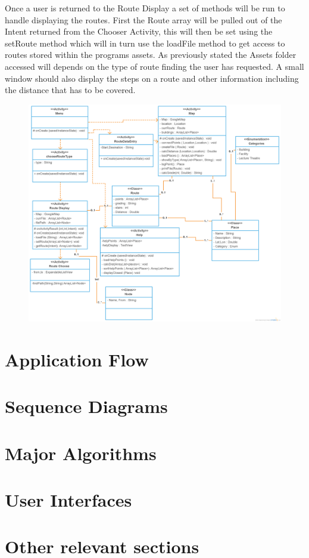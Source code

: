 Once a user is returned to the Route Display a set of methods will be run to handle displaying the routes. First the Route array will be pulled out of the Intent returned from the Chooser Activity, this will then be set using the setRoute method which will in turn use the loadFile method to get access to routes stored within the programs assets. As previously stated the Assets folder accessed will depends on the type of route finding the user has requested. A small window should also display the steps on a route and other information including the distance that has to be covered. 


\begin{figure}
\includegraphics[scale=0.28]{Chapter2/class.png} \\
\end{figure}
\newpage
\section{Application Flow}
\section{Sequence Diagrams}
\section{Major Algorithms}

\section{User Interfaces}

\section{Other relevant sections}